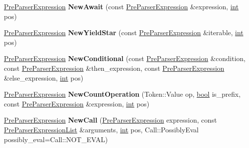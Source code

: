 \begin{DoxyCompactItemize}
\item 
\mbox{\label{classv8_1_1internal_1_1PreParserFactory_a8ed26814e9adb030214adb28fcfddd5b}} 
\mbox{\hyperlink{classv8_1_1internal_1_1PreParserExpression}{Pre\+Parser\+Expression}} {\bfseries New\+Await} (const \mbox{\hyperlink{classv8_1_1internal_1_1PreParserExpression}{Pre\+Parser\+Expression}} \&expression, \mbox{\hyperlink{classint}{int}} pos)
\item 
\mbox{\label{classv8_1_1internal_1_1PreParserFactory_aec60404c5c817d1ef1f71109e0256899}} 
\mbox{\hyperlink{classv8_1_1internal_1_1PreParserExpression}{Pre\+Parser\+Expression}} {\bfseries New\+Yield\+Star} (const \mbox{\hyperlink{classv8_1_1internal_1_1PreParserExpression}{Pre\+Parser\+Expression}} \&iterable, \mbox{\hyperlink{classint}{int}} pos)
\item 
\mbox{\label{classv8_1_1internal_1_1PreParserFactory_a077078e96679b4dd741967953ec4dec6}} 
\mbox{\hyperlink{classv8_1_1internal_1_1PreParserExpression}{Pre\+Parser\+Expression}} {\bfseries New\+Conditional} (const \mbox{\hyperlink{classv8_1_1internal_1_1PreParserExpression}{Pre\+Parser\+Expression}} \&condition, const \mbox{\hyperlink{classv8_1_1internal_1_1PreParserExpression}{Pre\+Parser\+Expression}} \&then\+\_\+expression, const \mbox{\hyperlink{classv8_1_1internal_1_1PreParserExpression}{Pre\+Parser\+Expression}} \&else\+\_\+expression, \mbox{\hyperlink{classint}{int}} pos)
\item 
\mbox{\label{classv8_1_1internal_1_1PreParserFactory_a671063dbfeadcb2e7f7a19a6eced7584}} 
\mbox{\hyperlink{classv8_1_1internal_1_1PreParserExpression}{Pre\+Parser\+Expression}} {\bfseries New\+Count\+Operation} (Token\+::\+Value op, \mbox{\hyperlink{classbool}{bool}} is\+\_\+prefix, const \mbox{\hyperlink{classv8_1_1internal_1_1PreParserExpression}{Pre\+Parser\+Expression}} \&expression, \mbox{\hyperlink{classint}{int}} pos)
\item 
\mbox{\label{classv8_1_1internal_1_1PreParserFactory_a811fbf8c8725d71a10a2c0c71effd33a}} 
\mbox{\hyperlink{classv8_1_1internal_1_1PreParserExpression}{Pre\+Parser\+Expression}} {\bfseries New\+Call} (\mbox{\hyperlink{classv8_1_1internal_1_1PreParserExpression}{Pre\+Parser\+Expression}} expression, const \mbox{\hyperlink{classv8_1_1internal_1_1PreParserExpressionList}{Pre\+Parser\+Expression\+List}} \&arguments, \mbox{\hyperlink{classint}{int}} pos, Call\+::\+Possibly\+Eval possibly\+\_\+eval=Call\+::\+N\+O\+T\+\_\+\+E\+V\+AL)

\end{DoxyCompactItemize}
